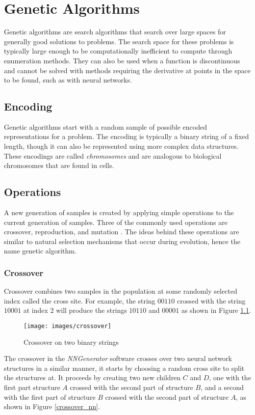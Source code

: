\chapter[Genetic Algorithms]{Genetic Algorithms}
Genetic algorithms are search algorithms that search over large spaces for generally good solutions to problems.
The search space for these problems is typically large enough to be computationally inefficient to compute through enumeration methods.
They can also be used when a function is discontinuous and cannot be
solved with methods requiring the derivative at points in the
space to be found, such as with neural networks.

\section{Encoding}
Genetic algorithms start with a random sample of possible encoded representations for a problem.
The encoding is typically a binary string of a fixed length, though it can also be represented using more complex data structures.
These encodings are called {\it chromosomes} and are analogous to biological chromosomes that are found in cells.

\section{Operations}
A new generation of samples is created by applying simple operations to the current generation of samples. 
Three of the commonly used operations are crossover, reproduction, and
mutation \cite{goldberg1}.
The ideas behind these operations are similar to natural selection mechanisms that occur during evolution, hence the name genetic algorithm. 

\subsection{Crossover}
Crossover combines two samples in the population at some randomly selected index called the cross site. 
For example, the string $00110$ crossed with the string $10001$ at index 2 will produce the strings $10110$ and $00001$ as shown in Figure \ref{crossover}.

\begin{figure}[h!]
  \centering
  \texttt{[image: images/crossover]}
  \caption{Crossover on two binary strings}
  \label{crossover}
\end{figure}

The crossover in the {\it NNGenerator} software crosses over two
neural network structures in a similar manner, it starts by choosing a
random cross site to split the structures at.
It proceeds by creating two new children $C$ and $D$, one with the first part
structure $A$ crossed with the second part of structure $B$, and a
second with the first part of structure $B$ crossed with the second
part of structure $A$, as shown in Figure \ref{crossover_nn}.

